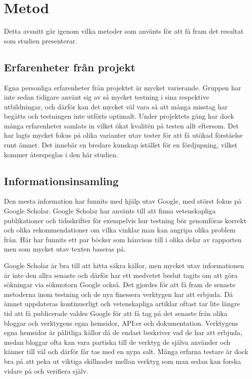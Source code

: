 \section{Metod}
\label{sec:david-method}
Detta avsnitt går igenom vilka metoder som använts för att få fram det resultat som studien presenterar.


\subsection{Erfarenheter från projekt}
Egna personliga erfarenheter från projektet är mycket varierande. Gruppen har inte sedan tidigare använt sig av så mycket testning i sina respektive utbildningar, och därför kan det mycket väl vara så att många misstag har begåtts och testningen inte utförts optimalt. Under projektets gång har dock många erfarenheter samlats in vilket ökat kvalitén på testen allt eftersom. Det har lagts mycket fokus på olika varianter utav tester för att få utökad förståelse runt ämnet. Det innebär en bredare kunskap istället för en fördjupning, vilket kommer återspeglas i den här studien.

\subsection{Informationsinsamling}
Den mesta information har funnits med hjälp utav Google, med störst fokus på Google Scholar. Google Scholar har använts till att finna vetenskapliga publikationer och tidsskrifter för exempelvis hur testning bör genomföras korrekt och olika rekommendationer om vilka vinklar man kan angripa olika problem från. Här har funnits ett par böcker som hänvisas till i olika delar av rapporten men som mycket utav texten baseras på. 

Google Scholar är bra till att hitta säkra källor, men mycket utav informationen är inte den allra senaste och därför har ett medvetet beslut tagits om att göra sökningar via sökmotorn Google också. Det gjordes för att få fram de senaste metoderna inom testning och de nya finessera verktygen har att erbjuda. Då ämnet uppdateras kontinuerligt och vetenskapliga artiklar oftast tar lite längre tid att få publicerade valdes Google för att få tag på det senaste från olika bloggar och verktygens egna hemsidor, API:er och dokumentation. Verktygens egna hemsidor är pålitliga källor då de endast beskriver vad de har att erbjuda, medan bloggar ofta kan vara partiska  till de verktyg de själva använder och känner till väl och därför får tas med en nypa salt. Många erfarna testare är dock bra på att peka ut viktiga skillnader mellan verktyg som man sedan kan forska vidare på och verifiera själv.

